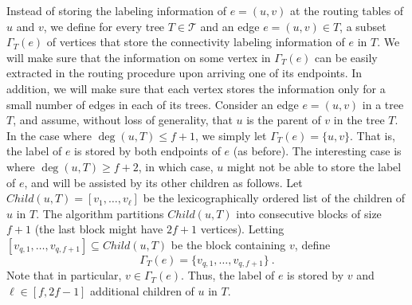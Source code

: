 Instead of storing the labeling information of $e=(u,v)$ at the routing tables of $u$ and $v$, we define 
for every tree $T \in \mathcal{T}$ and an edge $e=(u,v) \in T$, a subset $\Gamma_T(e)$ of vertices that store the connectivity labeling information of $e$ in $T$. We will make sure that the information on some vertex in $\Gamma_T(e)$ can be easily extracted in the routing procedure upon arriving one of its endpoints. In addition, we will make sure that each vertex stores the information only for a small number of edges in each of its trees. Consider an edge $e=(u,v)$ in a tree $T$, and assume, without loss of generality, that $u$ is the parent of $v$ in the tree $T$. In the case where $\deg(u,T)\leq f+1$, we simply let $\Gamma_T(e)=\{u,v\}$. That is, the label of $e$ is stored by both endpoints of $e$ (as before). The interesting case is where $\deg(u,T)\geq f+2$, in which case, $u$ might not be able to store the label of $e$, and will be assisted by its other children as follows.  Let $Child(u,T)=[v_1,\ldots, v_\ell]$ be the lexicographically ordered list of the children of $u$ in $T$.  The algorithm partitions $Child(u,T)$ into consecutive blocks of size $f+1$ (the last block might have $2f+1$ vertices). Letting $[v_{q,1}, \ldots, v_{q,f+1}] \subseteq Child(u,T)$ be the block containing $v$, define
$$\Gamma_T(e)=\{v_{q,1}, \ldots, v_{q,f+1}\}~.$$
Note that in particular, $v \in \Gamma_T(e)$. Thus, the label of $e$ is stored by $v$ and $\ell \in [f,2f-1]$ additional children of $u$ in $T$. 


